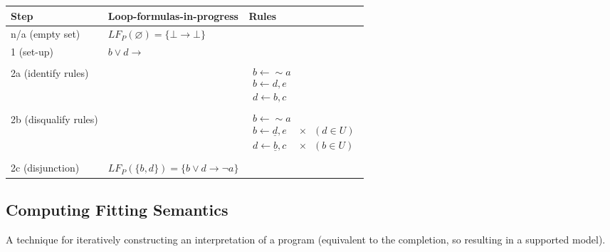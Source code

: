 \documentclass[9pt,a4paper,landscape]{article}
\begin{document}
{\begin{center}
	\begin{tabular}{p{3cm}p{5cm}p{6cm}}
		Step & Loop-formulas-in-progress & Rules \\ \midrule
		n/a (empty set) & $LF_P(\varnothing) = \{ \bot \rightarrow \bot \}$ & \\ \midrule
		
		1 (set-up) & $b \lor d \rightarrow$ & \\ & \\
		2a (identify rules) &  & $\begin{array}{l}
		b \leftarrow {\sim} a\\
		b \leftarrow d, e\\
		d \leftarrow b, c
		\end{array}$  \\ & \\
		2b (disqualify rules) &  & $\begin{array}{ll}
		b \leftarrow {\sim} a &  \\
		b \leftarrow \underline{d}, e & \times \hspace{8pt} (d \in U) \\
		d \leftarrow \underline{b}, c & \times \hspace{8pt} (b \in U) 
		\end{array}$  \\ & \\
		2c (disjunction) & $LF_P( \{b, d\} ) = \{b \lor d \rightarrow \neg a\}$ \\ \midrule
	\end{tabular}
\end{center}

\pagebreak


\subsection{Computing Fitting Semantics}
\label{subsec:fitting-sem}

A technique for iteratively constructing an interpretation of a program (equivalent to the completion, so resulting in a supported model).

}
\end{document}
